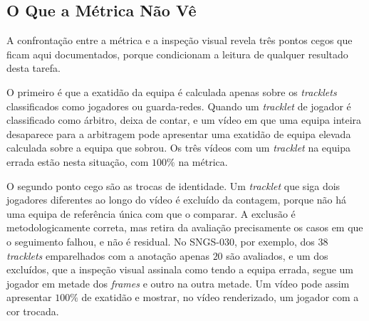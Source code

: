\subsection{O Que a Métrica Não Vê}\label{sec:res_equipa_metrica}

A confrontação entre a métrica e a inspeção visual revela três pontos cegos que ficam aqui
documentados, porque condicionam a leitura de qualquer resultado desta tarefa.

O primeiro é que a exatidão da equipa é calculada apenas sobre os \emph{tracklets} classificados
como jogadores ou guarda-redes. Quando um \emph{tracklet} de jogador é classificado como árbitro,
deixa de contar, e um vídeo em que uma equipa inteira desaparece para a arbitragem pode apresentar
uma exatidão de equipa elevada calculada sobre a equipa que sobrou. Os três vídeos com um
\emph{tracklet} na equipa errada estão nesta situação, com $100\%$ na métrica.

O segundo ponto cego são as trocas de identidade. Um \emph{tracklet} que siga dois jogadores
diferentes ao longo do vídeo é excluído da contagem, porque não há uma equipa de referência única
com que o comparar. A exclusão é metodologicamente correta, mas retira da avaliação precisamente os
casos em que o seguimento falhou, e não é residual. No SNGS-030, por exemplo, dos $38$ \emph{tracklets}
emparelhados com a anotação apenas $20$ são avaliados, e um dos excluídos, que a inspeção visual
assinala como tendo a equipa errada, segue um jogador em metade dos \emph{frames} e outro na outra
metade. Um vídeo pode assim apresentar $100\%$ de exatidão e mostrar, no vídeo renderizado, um
jogador com a cor trocada.

